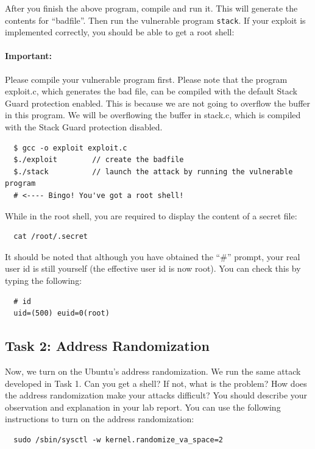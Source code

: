 After you finish the above program, compile and run it. This will generate
the contents for ``badfile''. Then run the vulnerable 
program {\tt stack}. If your exploit is implemented correctly, you should 
be able to get a root shell:  

\paragraph{Important:} Please compile your vulnerable program
first. Please note that the program exploit.c, which generates the bad
file, can be compiled with the default Stack Guard protection
enabled. This is because we are not going to overflow the buffer in
this program. We will be overflowing the buffer in stack.c, which is
compiled with the Stack Guard protection disabled.

\begin{verbatim}
  $ gcc -o exploit exploit.c
  $./exploit        // create the badfile
  $./stack          // launch the attack by running the vulnerable program
  # <---- Bingo! You've got a root shell! 
\end{verbatim}
While in the root shell, you are required to display the content of a secret file:
\begin{verbatim}
  cat /root/.secret
\end{verbatim}

It should be noted that although you have obtained the ``\#'' prompt, 
your real user id is still yourself (the effective user id is now
root). You can check this by typing the following:
\begin{verbatim}
  # id
  uid=(500) euid=0(root)
\end{verbatim}

\subsection{Task 2: Address Randomization}

Now, we turn on the Ubuntu's address randomization.  We run the same attack
developed in Task 1. Can you get a shell? If not, what is the problem?
How does the address randomization make your attacks difficult?
You should describe your observation and explanation
in your lab report. You can use the following instructions to turn
on the address randomization:

\begin{verbatim}
  sudo /sbin/sysctl -w kernel.randomize_va_space=2
\end{verbatim}


